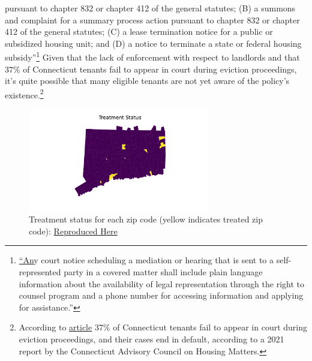 \documentclass[a4paper,12pt]{article}
\begin{document}
{pursuant to chapter 832 or chapter 412 of the general statutes; (B) a
summons and complaint for a summary process action pursuant to
chapter 832 or chapter 412 of the general statutes; (C) a lease termination
notice for a public or subsidized housing unit; and (D) a notice to
terminate a state or federal housing subsidy''}\footnote{\href{https://www.cga.ct.gov/2021/ACT/PA/PDF/2021PA-00034-R00HB-06531-PA.PDF}{``An}y court notice scheduling a mediation or hearing that is sent to
a self-represented party in a covered matter shall include plain language
information about the availability of legal representation through the
right to counsel program and a phone number for accessing information
and applying for assistance.''} Given that the lack of enforcement with respect to landlords and that $37\%$ of Connecticut tenants fail to appear in court during eviction proceedings, it's quite possible that many eligible tenants are not yet aware of the policy's existence.\footnote{According to \href{https://www.ctpublic.org/news/2022-01-30/some-residents-facing-eviction-could-now-be-eligible-for-free-legal-aid}{article} $37\%$ of Connecticut tenants fail to appear in court during eviction proceedings, and their cases end in default, according to a 2021 report by the Connecticut Advisory Council on Housing Matters.}
\begin{figure}[htbp]
\centering
\includegraphics[width=0.7\textwidth]{figures/rtc/maps/zip_code_status.pdf}  
        \caption{Treatment status for each zip code (yellow indicates treated zip code): \href{https://github.com/pharringtonp19/evictions/blob/main/scripts/joint/maps/treatment_status.py}{Reproduced Here}}
\end{figure}
\end{document}
